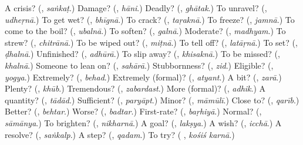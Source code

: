 \begin{tcolorbox}[breakable,colback=teal!4,colframe=teal!35!black,title={Before you move on}]
A crisis? (\textbf{}, \emph{saṅkaṭ}.) Damage? (\textbf{}, \emph{hāni}.) Deadly? (\textbf{}, \emph{ghātak}.) To unravel? (\textbf{}, \emph{udheṛnā}.) To get wet? (\textbf{}, \emph{bhīgnā}.) To crack? (\textbf{}, \emph{taṛaknā}.) To freeze? (\textbf{}, \emph{jamnā}.) To come to the boil? (\textbf{}, \emph{ubalnā}.) To soften? (\textbf{}, \emph{galnā}.) Moderate? (\textbf{}, \emph{madhyam}.) To strew? (\textbf{}, \emph{chitrānā}.) To be wiped out? (\textbf{}, \emph{miṭnā}.) To tell off? (\textbf{}, \emph{latāṛnā}.) To set? (\textbf{}, \emph{ḍhalnā}.) Unfinished? (\textbf{}, \emph{adhūrā}.) To slip away? (\textbf{}, \emph{khisaknā}.) To be missed? (\textbf{}, \emph{khalnā}.) Someone to lean on? (\textbf{}, \emph{sahārā}.) Stubbornness? (\textbf{}, \emph{zid}.) Eligible? (\textbf{}, \emph{yogya}.) Extremely? (\textbf{}, \emph{behad}.) Extremely (formal)? (\textbf{}, \emph{atyant}.) A bit? (\textbf{}, \emph{zarā}.) Plenty? (\textbf{}, \emph{khūb}.) Tremendous? (\textbf{}, \emph{zabardast}.) More (formal)? (\textbf{}, \emph{adhik}.) A quantity? (\textbf{}, \emph{tādād}.) Sufficient? (\textbf{}, \emph{paryāpt}.) Minor? (\textbf{}, \emph{māmūlī}.) Close to? (\textbf{}, \emph{qarīb}.) Better? (\textbf{}, \emph{behtar}.) Worse? (\textbf{}, \emph{badtar}.) First-rate? (\textbf{}, \emph{baṛhiyā}.) Normal? (\textbf{}, \emph{sāmānya}.) To brighten? (\textbf{}, \emph{nikharnā}.) A goal? (\textbf{}, \emph{lakṣya}.) A wish? (\textbf{}, \emph{icchā}.) A resolve? (\textbf{}, \emph{saṅkalp}.) A step? (\textbf{}, \emph{qadam}.) To try? (\textbf{ }, \emph{kośiś karnā}.)
\end{tcolorbox}
